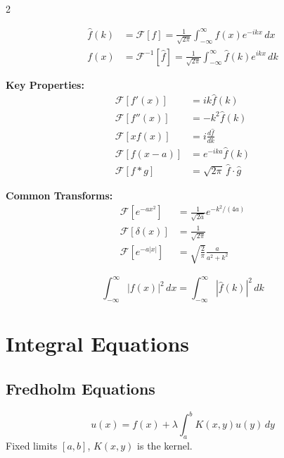 \documentclass[10pt,a4paper]{article}
\begin{document}
\begin{multicols}{2}
\begin{keyformula}[Definition]
\begin{align}
\hat{f}(k) &= \mathcal{F}[f] = \frac{1}{\sqrt{2\pi}}\int_{-\infty}^{\infty} f(x)e^{-ikx}\,dx \\
f(x) &= \mathcal{F}^{-1}[\hat{f}] = \frac{1}{\sqrt{2\pi}}\int_{-\infty}^{\infty} \hat{f}(k)e^{ikx}\,dk
\end{align}
\end{keyformula}

\textbf{Key Properties:}
\begin{align}
\mathcal{F}[f'(x)] &= ik\hat{f}(k) \\
\mathcal{F}[f''(x)] &= -k^2\hat{f}(k) \\
\mathcal{F}[xf(x)] &= i\frac{d\hat{f}}{dk} \\
\mathcal{F}[f(x-a)] &= e^{-ika}\hat{f}(k) \\
\mathcal{F}[f*g] &= \sqrt{2\pi}\,\hat{f}\cdot\hat{g}
\end{align}

\textbf{Common Transforms:}
\begin{align}
\mathcal{F}[e^{-ax^2}] &= \frac{1}{\sqrt{2a}}e^{-k^2/(4a)} \\
\mathcal{F}[\delta(x)] &= \frac{1}{\sqrt{2\pi}} \\
\mathcal{F}[e^{-a|x|}] &= \sqrt{\frac{2}{\pi}}\frac{a}{a^2+k^2}
\end{align}

\begin{keyformula}
\begin{equation}
\int_{-\infty}^{\infty}|f(x)|^2\,dx = \int_{-\infty}^{\infty}|\hat{f}(k)|^2\,dk
\end{equation}
\end{keyformula}

\section{Integral Equations}

\subsection{Fredholm Equations}
\begin{keyformula}
\begin{equation}
u(x) = f(x) + \lambda\int_a^b K(x,y)u(y)\,dy
\end{equation}
Fixed limits $[a,b]$, $K(x,y)$ is the kernel.
\end{keyformula}


\end{multicols}
\end{document}
